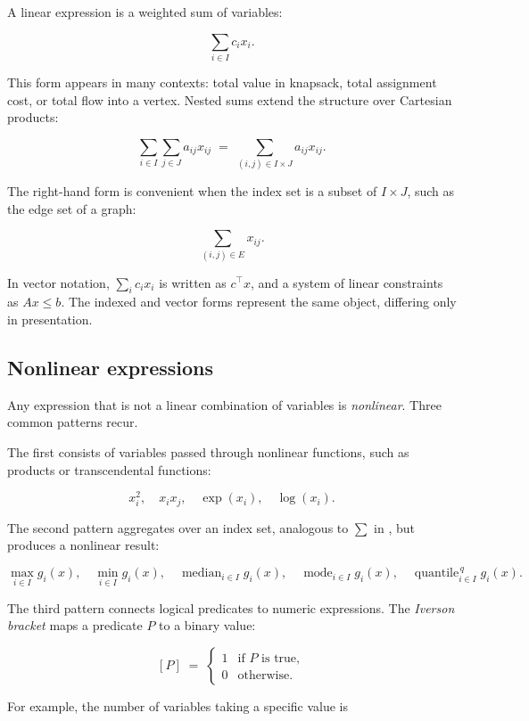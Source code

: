 A linear expression is a weighted sum of variables:

\[
\sum_{i \in I} c_i x_i.
\]

This form appears in many contexts: total value in knapsack, total
assignment cost, or total flow into a vertex. Nested sums extend the
structure over Cartesian products:

\[
\sum_{i \in I} \sum_{j \in J} a_{ij} x_{ij}
\;=\;
\sum_{(i,j) \in I \times J} a_{ij} x_{ij}.
\]

The right-hand form is convenient when the index set is a subset of
\(I \times J\), such as the edge set of a graph:

\[
\sum_{(i,j) \in E} x_{ij}.
\]

In vector notation, \(\sum_i c_i x_i\) is written as \(c^\top x\), and a
system of linear constraints as \(A x \le b\). The indexed and vector
forms represent the same object, differing only in presentation.

\subsection{Nonlinear expressions}\label{sec:2.5.2}

Any expression that is not a linear combination of variables is
\emph{nonlinear}. Three common patterns recur.

The first consists of variables passed through nonlinear functions, such
as products or transcendental functions:

\[
x_i^2, \quad x_i x_j, \quad \exp(x_i), \quad \log(x_i).
\]

The second pattern aggregates over an index set, analogous to \(\sum\)
in , but produces a nonlinear result:

\[
\max_{i \in I} g_i(x), \quad \min_{i \in I} g_i(x), \quad
\operatorname{median}_{i \in I} g_i(x), \quad
\operatorname{mode}_{i \in I} g_i(x), \quad
\operatorname{quantile}_{i \in I}^{\,q} g_i(x).
\]

The third pattern connects logical predicates to numeric expressions.
The \emph{Iverson bracket} maps a predicate \(P\) to a binary value:

\[
[P] \;=\; \begin{cases} 1 & \text{if } P \text{ is true}, \\ 0 & \text{otherwise.} \end{cases}
\]

For example, the number of variables taking a specific value is

